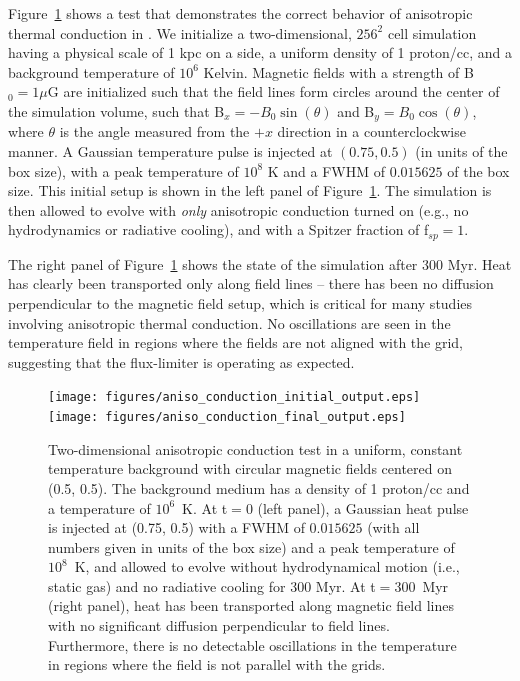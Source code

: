 Figure~\ref{fig.conduct} shows a test that demonstrates the
correct behavior of anisotropic thermal conduction in \enzo.  We
initialize a two-dimensional, $256^2$ cell simulation having a physical
scale of 1 kpc on a side, a uniform density of 1 proton/cc, and a
background temperature of $10^6$ Kelvin.  Magnetic fields with a
strength of  B$_0 = 1 \mu$G are initialized such that the field lines form
circles around the center of the simulation volume, such that B$_x =
-B_0\sin(\theta)$ and B$_y = B_0\cos(\theta)$, where $\theta$ is the
angle measured from the $+x$ direction in a counterclockwise manner.
A Gaussian temperature pulse is injected at $(0.75, 0.5)$ (in units of the box
size), with a peak temperature of $10^8$ K and a FWHM of $0.015625$ of
the box size.  This initial setup is shown in the left panel of
Figure~\ref{fig.conduct}.  The simulation is then allowed to evolve
with \textit{only} anisotropic conduction turned on (e.g.,
no hydrodynamics or radiative cooling), and with a Spitzer fraction of
f$_{sp} = 1$.  

The right panel of Figure~\ref{fig.conduct} shows the state of the
simulation after 300 Myr.  Heat has clearly been transported only along
field lines -- there has been no diffusion perpendicular to the
magnetic field setup, which is critical for many studies involving
anisotropic thermal conduction.  No oscillations are seen in the
temperature field in regions where the fields are not aligned with the
grid, suggesting that the flux-limiter is operating as expected.

\begin{figure}
\begin{center}
\texttt{[image: figures/aniso\_conduction\_initial\_output.eps]}
\texttt{[image: figures/aniso\_conduction\_final\_output.eps]}
\caption{Two-dimensional anisotropic conduction test in a uniform,
constant temperature background with circular magnetic fields centered
on (0.5, 0.5).  The background medium has a density of 1 proton/cc and
a temperature of $10^6$~K.  At t$ = 0$ (left panel), a Gaussian heat
pulse is injected at (0.75, 0.5) with a FWHM of $0.015625$ (with all
numbers given in units of the box size) and a peak temperature of
$10^8$~K, and allowed to evolve without hydrodynamical motion (i.e.,
static gas) and no radiative cooling for 300 Myr.  At t$ = 300$~Myr
(right panel), heat has been transported along magnetic field lines
with no significant diffusion perpendicular to field
lines. Furthermore, there is no detectable oscillations in the
temperature in regions where the field is not parallel with the grids.}
\label{fig.conduct}
\end{center}
\end{figure}


